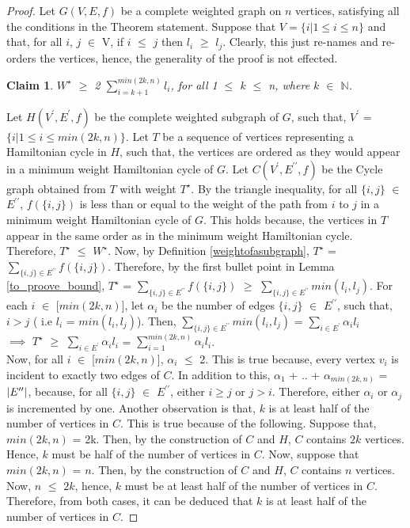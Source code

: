 \documentclass[12pt]{article}
\newtheorem{claim}{Claim}
\numberwithin{equation}{subsection}
\numberwithin{table}{subsection}
\begin{document}
\begin{proof}
Let $G(V,E,f)$ be a complete weighted graph on $n$ vertices, satisfying all the conditions in the Theorem statement. Suppose that $V=\{i | 1 \leq i \leq n\}$ and that, for all $i$, $j$ $\in$ V, if $i$ $\leq$ $j$ then $l_i$ $\geq$ $l_j$. Clearly, this just re-names and re-orders the vertices, hence, the generality of the proof is not effected.
\begin{claim}
\label{claim1}
$W^\star$ $\geq$ 2 $\sum_{i = k+1}^{min(2k, n)} l_i$, for all 1 $\leq$ $k$ $\leq$ n, where $k$ $\in$ $\mathbb{N}$.
\end{claim}
Let $H(V^\prime,E^\prime,f)$ be the complete weighted subgraph of $G$, such that, $V^\prime$ = $\{i | 1 \leq i \leq min(2k, n)\}$. Let $T$ be a sequence of vertices representing a Hamiltonian cycle in $H$, such that, the vertices are ordered as they would appear in a minimum weight Hamiltonian cycle of $G$. Let $C(V^\prime, E^{\prime\prime}, f)$ be the Cycle graph obtained from $T$ with weight $T^\star$. By the triangle inequality, for all $\{i, j\}$ $\in$ $E^{\prime\prime}$, $f(\{i, j\})$ is less than or equal to the weight of the path from $i$ to $j$ in a minimum weight Hamiltonian cycle of $G$. This holds because, the vertices in $T$ appear in the same order as in the minimum weight Hamiltonian cycle. Therefore, $T^\star$ $\leq$ $W^\star$. Now, by Definition \ref{weightofasubgraph}, $T^\star$ =  $\sum_{\{i, j\} \in E^{\prime\prime}} f(\{i, j\})$. Therefore, by the first bullet point in Lemma \ref{to_proove_bound},  $T^\star$ = $\sum_{\{i, j\} \in E^{\prime\prime}} f(\{i, j\})$ $\geq$  $\sum_{\{i, j\} \in E^{\prime\prime}} min(l_i, l_j)$. For each $i$ $\in$ [$min(2k, n)$], let $\alpha_i$ be the number of edges $\{i, j\}$ $\in$ $E^{\prime\prime}$, such that, $i > j$ ( i.e $l_i$ = $min(l_i, l_j)$). Then, $\sum_{\{i, j\} \in E^{\prime\prime}} min(l_i, l_j)$ = $\sum_{i \in E^\prime} \alpha_il_i$\\
$\implies$ $T^\star$ $\geq$ $\sum_{i \in E^\prime} \alpha_i l_i$ = $\sum_{i =1}^{min(2k, n)} \alpha_i l_i$.\\ Now, for all $i$ $\in$ [$min(2k, n)$], $\alpha_i$ $\leq$ 2. This is true because, every vertex $v_i$ is incident to exactly two edges of $C$. In addition to this, $\alpha_1$ + .. + $\alpha_{min(2k, n)}$ = $\abs{E^{\prime\prime}}$, because, for all $\{i,j\}$ $\in$ $E^{\prime\prime}$, either $ i \geq j$ or $j > i$. Therefore, either $\alpha_i$ or $\alpha_j$ is incremented by one. Another observation is that, $k$ is at least half of the number of vertices in $C$. This is true because of the following. Suppose that, $min(2k, n)$ = 2k. Then, by the construction of $C$ and $H$, $C$ contains $2k$ vertices. Hence, $k$ must be half of the number of vertices in $C$. Now, suppose that $min(2k, n)$ = $n$. Then, by the construction of $C$ and $H$, $C$ contains $n$ vertices. Now, $n$ $\leq$ $2k$, hence, $k$ must be at least half of the number of vertices in $C$. Therefore, from both cases, it can be deduced that $k$ is at least half of the number of vertices in $C$.

\end{proof}
\end{document}
